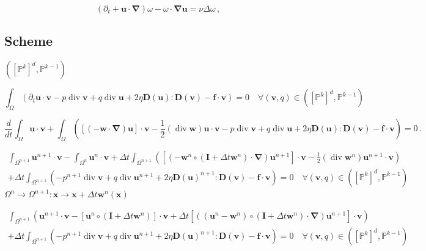 \documentclass{article}
\theoremstyle{plain}
\numberwithin{equation}{section} %
\newcommand{\dt}{\Delta t}
\newcommand{\f}{\boldsymbol{f}}
\newcommand{\I}{\boldsymbol{I}}
\newcommand{\xx}{\boldsymbol{x}}
\renewcommand{\to}{\rightarrow}
\renewcommand{\div}{\operatorname{div}}
\newcommand{\grad}{\boldsymbol{\nabla}}
\newcommand{\bu}{{\boldsymbol{u}}}
\newcommand{\bv}{\boldsymbol{v}}
\newcommand{\bw}{\boldsymbol{w}}
\def\Dbu{\boldsymbol{D}(\bu)}
\def\Dbv{\boldsymbol{D}(\bv)}
\begin{document}
\begin{equation}
\label{eq:vorticite}
 (\partial_t+\bu\cdot\grad)\omega - \omega\cdot\grad\bu = \nu \Delta \omega\,,
\end{equation}

\subsection{Scheme}

$([\mathbb{P}^k]^d,\mathbb{P}^{k-1})$

$$
\int_{\Omega} \left( \partial_t\bu\cdot\bv %
- p \div\bv + q \div\bu + 2\eta\Dbu:\Dbv - \f\cdot\bv \right)
= 0  \quad  \forall (\bv,q)\in([\mathbb{P}^k]^d,\mathbb{P}^{k-1})
$$

$$
\frac{d}{dt} \int_{\Omega} \bu\cdot\bv + \int_{\Omega} \left( [(-\bw\cdot\grad)\bu]\cdot\bv %
- \frac12(\div\bw)\bu\cdot\bv - p \div\bv + q \div\bu + 2\eta\Dbu:\Dbv - \f\cdot\bv \right)
= 0  \,. %
$$

\begin{multline}
 \int_{\Omega^{n+1}} \bu^{n+1}\cdot\bv  - \int_{\Omega^{n}} \bu^{n}\cdot\bv  
+ \dt \int_{\Omega^{n+1}} \left( [(-\bw^{n}\circ(\I+\dt\bw^n)\cdot\grad)\bu^{n+1}]\cdot\bv %
- \frac12(\div\bw^n)\bu^{n+1}\cdot\bv \right)
\\
+ \dt \int_{\Omega^{n+1}} \left( - p^{n+1} \div\bv + q \div\bu^{n+1} + 2\eta\Dbu^{n+1}:\Dbv - \f\cdot\bv \right) = 0 \quad \forall (\bv,q)\in([\mathbb{P}^k]^d,\mathbb{P}^{k-1})
\end{multline}
$\Omega^{n}\to\Omega^{n+1}:\xx\to\xx+\dt\bw^n(\xx)$

\begin{multline}
 \int_{\Omega^{n+1}} \left( \bu^{n+1}\cdot\bv - [\bu^{n}\circ(\I+\dt\bw^n)]\cdot\bv + \dt [((\bu^{n}-\bw^{n})\circ(\I+\dt\bw^n)\cdot\grad)\bu^{n+1}]\cdot\bv \right)
\\
+ \dt \int_{\Omega^{n+1}} \left( - p^{n+1} \div\bv + q \div\bu^{n+1} + 2\eta\Dbu^{n+1}:\Dbv - \f\cdot\bv \right) = 0 \quad \forall (\bv,q)\in([\mathbb{P}^k]^d,\mathbb{P}^{k-1})
\end{multline}

%

%
%
\end{document}

